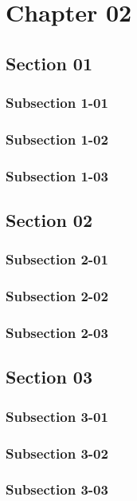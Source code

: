 \chapter{Chapter 02}
\thispagestyle{empty}

\bt

\section{Section 01}
\bt
\subsection{Subsection 1-01}
\bt
\subsection{Subsection 1-02}
\bt
\subsection{Subsection 1-03}
\bt

\section{Section 02}
\bt
\subsection{Subsection 2-01}
\bt
\subsection{Subsection 2-02}
\bt
\subsection{Subsection 2-03}
\bt

\section{Section 03}
\bt
\subsection{Subsection 3-01}
\bt
\subsection{Subsection 3-02}
\bt
\subsection{Subsection 3-03}
\bt
